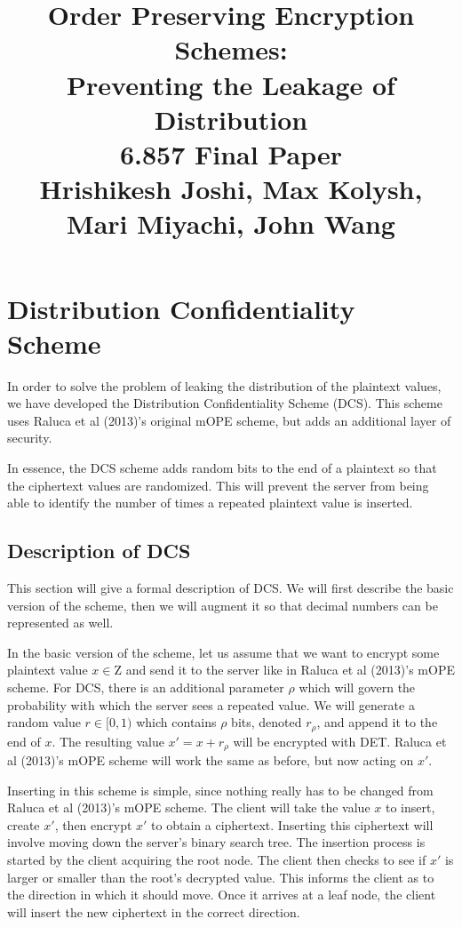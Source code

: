 \documentclass[12pt]{article}
\title{Order Preserving Encryption Schemes: \\
  Preventing the Leakage of Distribution\\
6.857 Final Paper \\
Hrishikesh Joshi, Max Kolysh, Mari Miyachi, John Wang}
\begin{document}
\maketitle

\section{Distribution Confidentiality Scheme}

In order to solve the problem of leaking the distribution of the plaintext values, we have developed the Distribution Confidentiality Scheme (DCS). This scheme uses Raluca et al (2013)'s original mOPE scheme, but adds an additional layer of security.

In essence, the DCS scheme adds random bits to the end of a plaintext so that the ciphertext values are randomized. This will prevent the server from being able to identify the number of times a repeated plaintext value is inserted.

\subsection{Description of DCS}

This section will give a formal description of DCS. We will first describe the basic version of the scheme, then we will augment it so that decimal numbers can be represented as well.

In the basic version of the scheme, let us assume that we want to encrypt some plaintext value $x \in \mathrm{Z}$ and send it to the server like in Raluca et al (2013)'s mOPE scheme. For DCS, there is an additional parameter $\rho$ which will govern the probability with which the server sees a repeated value. We will generate a random value $r \in [0,1)$ which contains $\rho$ bits, denoted $r_{\rho}$, and append it to the end of $x$. The resulting value $x' = x + r_{\rho}$ will be encrypted with DET. Raluca et al (2013)'s mOPE scheme will work the same as before, but now acting on $x'$.

Inserting in this scheme is simple, since nothing really has to be changed from Raluca et al (2013)'s mOPE scheme. The client will take the value $x$ to insert, create $x'$, then encrypt $x'$ to obtain a ciphertext. Inserting this ciphertext will involve moving down the server's binary search tree. The insertion process is started by the client acquiring the root node. The client then checks to see if $x'$ is larger or smaller than the root's decrypted value. This informs the client as to the direction in which it should move. Once it arrives at a leaf node, the client will insert the new ciphertext in the correct direction.
\end{document}
